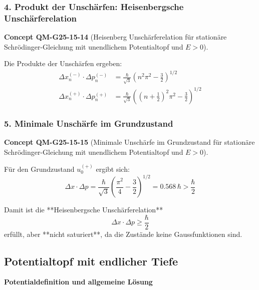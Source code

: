 \documentclass[10pt, letterpaper]{article}
\newcommand{\CustomHeading}[3]{%
  \par\medskip\noindent%
  \textbf{#1 #2} \textnormal{(#3)}.\enskip%
}
\newenvironment{CONC}[2]{\begin{unitbox}\CustomHeading{Concept}{#1}{#2}}{\end{unitbox}}
\begin{document}
\subsubsection*{4. Produkt der Unschärfen: Heisenbergsche Unschärferelation}

\begin{CONC}{QM-G25-15-14}{Heisenberg Unschärferelation für stationäre Schrödinger-Gleichung mit unendlichem Potentialtopf und $E>0$}
Die Produkte der Unschärfen ergeben:
\[
\begin{aligned}
\Delta x_n^{(-)} \cdot \Delta p_n^{(-)} &= \frac{\hbar}{\sqrt{3}} \left(n^2 \pi^2 - \frac{3}{2} \right)^{1/2} \\
\Delta x_n^{(+)} \cdot \Delta p_n^{(+)} &= \frac{\hbar}{\sqrt{3}} \left((n + \tfrac{1}{2})^2 \pi^2 - \frac{3}{2} \right)^{1/2}
\end{aligned}
\]
\end{CONC}

\subsubsection*{5. Minimale Unschärfe im Grundzustand}

\begin{CONC}{QM-G25-15-15}{Minimale Unschärfe im Grundzustand für stationäre Schrödinger-Gleichung mit unendlichem Potentialtopf und $E>0$}
Für den Grundzustand \( u_0^{(+)} \) ergibt sich:
\[
\Delta x \cdot \Delta p = \frac{\hbar}{\sqrt{3}} \left( \frac{\pi^2}{4} - \frac{3}{2} \right)^{1/2}
= 0.568\, \hbar > \frac{\hbar}{2}
\]

Damit ist die **Heisenbergsche Unschärferelation**
\[
\Delta x \cdot \Delta p \geq \frac{\hbar}{2}
\]
erfüllt, aber **nicht saturiert**, da die Zustände keine Gaussfunktionen sind.
\end{CONC}







\pagebreak


\subsection{Potentialtopf mit endlicher Tiefe}




\textbf{Potentialdefinition und allgemeine Lösung}
\end{document}
